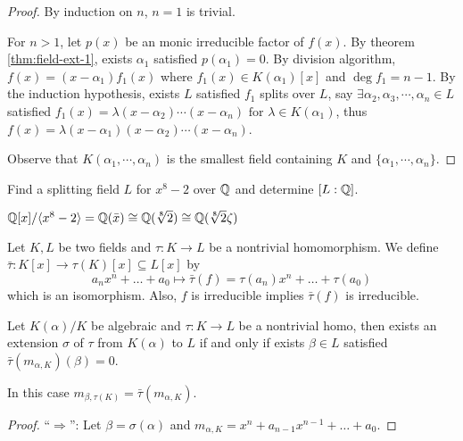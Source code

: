 \begin{proof}
  By induction on $n$, $n = 1$ is trivial.

  For $n > 1$, let $p(x)$ be an monic irreducible factor of $f(x)$.
  By theorem \ref{thm:field-ext-1}, exists $\alpha_1$ satisfied $p(\alpha_1) = 0$.
  By division algorithm, $f(x) = (x - \alpha_1) f_1(x)$ where $f_1(x) \in K(\alpha_1)[x]$
  and $\deg f_1 = n - 1$. By the induction hypothesis, exists $L$ satisfied $f_1$
  splits over $L$, say $\exists \alpha_2, \alpha_3, \cdots, \alpha_n \in L$ satisfied
  $ f_1(x) = \lambda (x - \alpha_2) \cdots (x - \alpha_n) \text{ for } \lambda  \in K(\alpha_1) $,
  thus $f(x) = \lambda (x - \alpha_1) (x - \alpha_2) \cdots (x - \alpha_n)$.

  Observe that $K(\alpha_1, \cdots, \alpha_n)$ is the smallest field containing $K$ and
  $\{ \alpha_1, \cdots, \alpha_n\}$.
\end{proof}

\begin{example}
  Find a splitting field $L$ for $x^8 - 2$ over $\mathbb{Q}$ and determine $[L : \mathbb{Q}]$.
\end{example}

\begin{remark}
  ${\mathbb{Q}[x]}/{\langle x^8 - 2\rangle} = \mathbb{Q}(\bar{x}) \cong \mathbb{Q}(\sqrt[8]{2})
  \cong \mathbb{Q}(\sqrt[8]{2} \zeta)$
\end{remark}

\begin{prop}
  Let $K, L$ be two fields and $\tau: K \to L$ be a nontrivial homomorphism.
  We define $\bar\tau : K[x] \to \tau(K)[x] \subseteq L[x]$ by
  \[ a_n x^n + \ldots + a_0 \mapsto \bar\tau(f) = \tau(a_n)x^n + \ldots + \tau(a_0) \]
  which is an isomorphism. Also, $f$ is irreducible implies $\bar\tau(f)$ is irreducible.
\end{prop}

\begin{lemma}
  Let $K(\alpha) / K$ be algebraic and $\tau: K \to L$ be a nontrivial homo,
  then exists an extension $\sigma$ of $\tau$ from $K(\alpha)$ to $L$ if and only if
  exists $\beta \in L$ satisfied $\bar\tau(m_{\alpha, K})(\beta) = 0$.

  In this case $m_{\beta, \tau(K)} = \bar\tau(m_{\alpha, K})$.
\end{lemma}

\begin{proof}
  ``$\Rightarrow$'': Let $\beta = \sigma(\alpha)$ and $m_{\alpha, K} = x^n + a_{n-1} x^{n-1} + \ldots + a_0$.
\end{proof}

